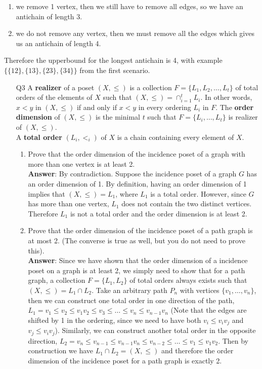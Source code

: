 \documentclass{article}
\begin{document}
\begin{itemize}
\begin{enumerate}
\begin{enumerate}
                              \item we remove 1 vertex, then we still have to remove all edges, so we have an antichain of length 3.
                              \item we do not remove any vertex, then we must remove all the edges which gives us an antichain of length 4.
                        \end{enumerate}
                        Therefore the upperbound for the longest antichain is 4, with example $\{\{12\},\{13\},\{23\},\{34\}\}$ from the first scenario.
            \end{enumerate}
\end{itemize}

\newpage
\begin{itemize}
      \item [Q3]
            A \textbf{realizer} of a poset $(X,\leq)$ is a collection $F=\{L_1,L_2,\ldots,L_t\}$ of total orders of the elements of $X$ such that $(X,\leq)=\cap_{i=1}^t L_i$. In other words, $x<y$ in $(X,\leq)$ if and only if $x<y$ in every ordering $L_i$ in $F$. The \textbf{order dimension} of $(X,\leq)$ is the minimal $t$ such that $F=\{L_i,\ldots,L_t\}$ is realizer of $(X,\leq)$.\\
            A \textbf{total order} $(L_i,<_i)$ of $X$ is a chain containing every element of $X$.
            \begin{enumerate}
                  \item Prove that the order dimension of the incidence poset of a graph with more than one vertex is at least 2.\\
                        \textbf{Answer}: By contradiction. Suppose the incidence poset of a graph $G$ has an order dimension of 1. By definition, having an order dimension of 1 implies that $(X,\leq)=L_1$, where $L_1$ is a total order. However, since $G$ has more than one vertex, $L_1$ does not contain the two distinct vertices. Therefore $L_1$ is not a total order and the order dimension is at least 2.
                  \item Prove that the order dimension of the incidence poset of a path graph is at most 2. (The converse is true as well, but you do not need to prove this).\\
                        \textbf{Answer}: Since we have shown that the order dimension of a incidence poset on a graph is at least 2, we simply need to show that for a path graph, a collection $F=\{L_1,L_2\}$ of total orders always exists such that $(X,\leq)=L_1\cap L_2$. Take an arbitrary path $P_n$ with vertices $\{v_1,\ldots,v_n\}$, then we can construct one total order in one direction of the path, $L_1=v_1\leq v_2\leq v_1v_2\leq v_3\leq\ldots\leq v_n\leq v_{n-1}v_n$ (Note that the edges are shifted by 1 in the ordering, since we need to have both $v_i\leq v_iv_j$ and $v_j\leq v_iv_j$). Similarly, we can construct another total order in the opposite direction, $L_2=v_n\leq v_{n-1}\leq v_{n-1}v_n\leq v_{n-2}\leq\ldots\leq v_1\leq v_1v_2$. Then by construction we have $L_1\cap L_2=(X,\leq)$ and therefore the order dimension of  the incidence poset for a path graph is exactly 2.

\end{enumerate}
\end{itemize}
\end{document}
